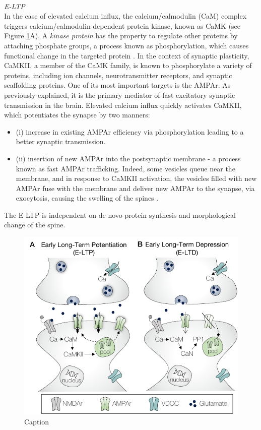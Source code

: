 ~\\
\textit{\acrfull{E-LTP}}\\
In the case of elevated  calcium influx, the calcium/calmodulin (CaM) complex triggers calcium/calmodulin dependent protein kinase, known as CaMK (see Figure \ref{fig:SP_E-LTP}A). A \textit{kinase protein} has the property to regulate other proteins by attaching phosphate groups, a process known as phosphorylation, which causes functional change in the targeted protein \citep{bear_neuroscience_2016, seibt_primed_2019}. In the context of synaptic plasticity,  CaMKII, a member of the CaMK family,  is known to phosphorylate a variety of proteins, including ion channels, neurotransmitter receptors, and synaptic scaffolding proteins. One of its most important targets is the \acrshort{AMPAr}. As previously explained, it is the primary mediator of fast excitatory synaptic transmission in the brain. Elevated calcium influx quickly activates CaMKII, which potentiates the synapse by two manners: 
\begin{itemize}
    \item (i) increase in existing \acrshort{AMPAr} efficiency via phosphorylation leading to a better synaptic transmission.
    \item (ii) insertion of new \acrshort{AMPAr} into the postsynaptic membrane - a process known as fast AMPAr trafficking.  Indeed, some vesicles queue near the membrane, and in response to \acrshort{CaMKII} activation, the vesicles filled with new \acrshort{AMPAr} fuse with the membrane and deliver new \acrshort{AMPAr} to the synapse, via exocytosis, causing the swelling of the spines \citep{seibt_primed_2019}.  
\end{itemize}
The \acrfull{E-LTP} is independent on de novo protein synthesis and morphological change of the spine. 

\begin{figure}[h!]
    \centering
    \includegraphics{latex/fig/Intro/SP_E-LTP.pdf}
    \caption{Caption}
    \label{fig:SP_E-LTP}
\end{figure}

